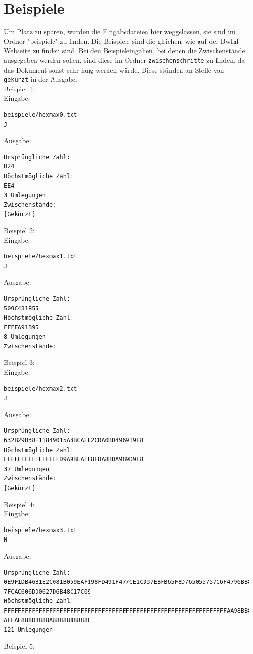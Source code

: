 \documentclass[a4paper,10pt,ngerman]{scrartcl}
\begin{document}
\section{Beispiele}
Um Platz zu sparen, wurden die Eingabedateien hier weggelassen, sie sind im Ordner "beispiele" zu finden. Die Beispiele sind die gleichen, wie auf der BwInf-Webseite zu finden sind. Bei den Beispieleingaben, bei denen die Zwischenstände ausgegeben werden sollen, sind diese im Ordner \lstinline|zwischenschritte| zu finden, da das Dokument sonst sehr lang werden würde. Diese stünden an Stelle von \lstinline|gekürzt| in der Ausgabe.\\
Beispiel 1: \\
Eingabe: \begin{lstlisting}
beispiele/hexmax0.txt
J
\end{lstlisting}
Ausgabe: \begin{lstlisting}
Ursprüngliche Zahl:
D24
Höchstmögliche Zahl:
EE4
3 Umlegungen
Zwischenstände:
[Gekürzt]
\end{lstlisting}
Beispiel 2: \\
Eingabe: \begin{lstlisting}
beispiele/hexmax1.txt
J
\end{lstlisting}
Ausgabe: \begin{lstlisting}
Ursprüngliche Zahl:
509C431B55
Höchstmögliche Zahl:
FFFEA91B95
8 Umlegungen
Zwischenstände:
\end{lstlisting}
Beispiel 3: \\
Eingabe: \begin{lstlisting}
beispiele/hexmax2.txt
J
\end{lstlisting}
Ausgabe: \begin{lstlisting}
Ursprüngliche Zahl:
632B29B38F11849015A3BCAEE2CDA0BD496919F8
Höchstmögliche Zahl:
FFFFFFFFFFFFFFFFD9A9BEAEE8EDA8BDA989D9F8
37 Umlegungen
Zwischenstände:
[Gekürzt]
\end{lstlisting}
Beispiel 4: \\
Eingabe: \begin{lstlisting}
beispiele/hexmax3.txt
N
\end{lstlisting}
Ausgabe: \begin{lstlisting}
Ursprüngliche Zahl:
0E9F1DB46B1E2C081B059EAF198FD491F477CE1CD37EBFB65F8D765055757C6F4796BB8B3DF
7FCAC606DD0627D6B48C17C09
Höchstmögliche Zahl:
FFFFFFFFFFFFFFFFFFFFFFFFFFFFFFFFFFFFFFFFFFFFFFFFFFFFFFFFFFFFFFFFAA98BB8B9DF
AFEAE888D8888A88888888888
121 Umlegungen
\end{lstlisting}
Beispiel 5: \\
\end{document}
